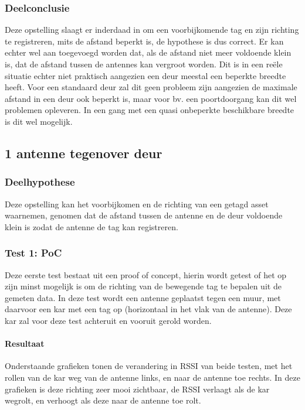 \subsubsection{Deelconclusie}
Deze opstelling slaagt er inderdaad in om een voorbijkomende tag en zijn richting te registreren, mits de afstand beperkt is, de hypothese is dus correct. Er kan echter wel aan toegevoegd worden dat, als de afstand niet meer voldoende klein is, dat de afstand tussen de antennes kan vergroot worden. Dit is in een reële situatie echter niet praktisch aangezien een deur meestal een beperkte breedte heeft. Voor een standaard deur zal dit geen probleem zijn aangezien de maximale afstand in een deur ook beperkt is, maar voor bv. een poortdoorgang kan dit wel problemen opleveren. In een gang met een quasi onbeperkte beschikbare breedte is dit wel mogelijk.

\subsection{1 antenne tegenover deur}
\subsubsection{Deelhypothese}
Deze opstelling kan het voorbijkomen en de richting van een getagd asset waarnemen, genomen dat de afstand tussen de antenne en de deur voldoende klein is zodat de antenne de tag kan registreren.

\subsubsection{Test 1: PoC}
Deze eerste test bestaat uit een proof of concept, hierin wordt getest of het op zijn minst mogelijk is om de richting van de bewegende tag te bepalen uit de gemeten data. 
In deze test wordt een antenne geplaatst tegen een muur, met daarvoor een kar met een tag op (horizontaal in het vlak van de antenne). Deze kar zal voor deze test achteruit en vooruit gerold worden. 

\paragraph{Resultaat}
Onderstaande grafieken tonen de verandering in RSSI van beide testen, met het rollen van de kar weg van de antenne links, en naar de antenne toe rechts. In deze grafieken is deze richting zeer mooi zichtbaar, de RSSI verlaagt als de kar wegrolt, en verhoogt als deze naar de antenne toe rolt.

